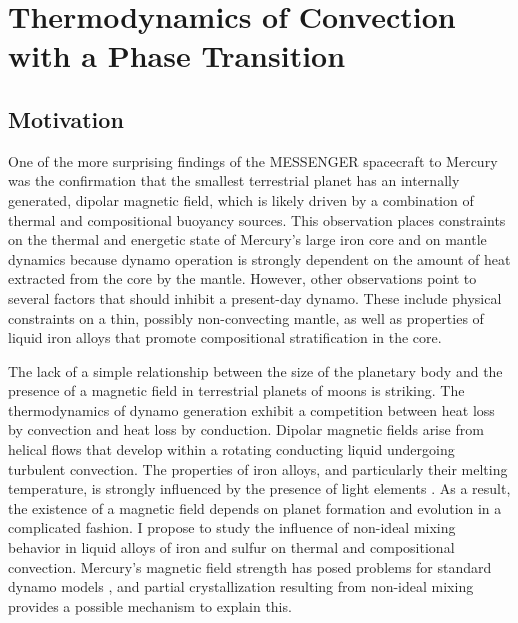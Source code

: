 \chapter{Thermodynamics of Convection with a Phase Transition}\label{chap5}


\section{Motivation}

One of the more surprising findings of the MESSENGER spacecraft to Mercury was
the confirmation that the smallest terrestrial planet has an internally
generated, dipolar magnetic field, which is likely driven by a combination of
thermal and compositional buoyancy sources. This observation places constraints
on the thermal and energetic state of Mercury's large iron core and on mantle
dynamics because dynamo operation is strongly dependent on the amount of heat
extracted from the core by the mantle. However, other observations point to
several factors that should inhibit a present-day dynamo. These include
physical constraints on a thin, possibly non-convecting mantle, as well as
properties of liquid iron alloys that promote compositional stratification in
the core.

The lack of a simple relationship between the size of the planetary body and the presence of a
magnetic field in terrestrial planets of moons is striking. The thermodynamics of
dynamo generation exhibit a competition between heat loss by convection and heat loss
by conduction.  Dipolar magnetic fields arise from helical flows that develop within
a rotating conducting liquid undergoing turbulent convection. The properties of iron
alloys, and particularly their melting temperature, is strongly influenced by the
presence of light elements \citep{sanloup2000}. As a result, the existence of a
magnetic field depends on planet formation and evolution in a complicated fashion. I
propose to study the influence of non-ideal mixing behavior in liquid alloys of iron
and sulfur on thermal and compositional convection. Mercury's magnetic field strength
has posed problems for standard dynamo models \citep{Christensen2006,Stanley2005},
and partial crystallization resulting from non-ideal mixing provides a possible
mechanism to explain this.

